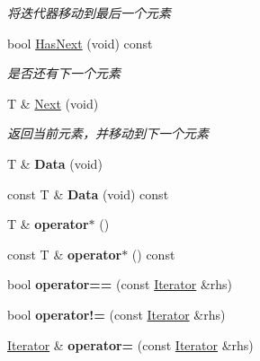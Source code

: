 \begin{DoxyCompactItemize}
\begin{DoxyCompactList}\small\item\em 将迭代器移动到最后一个元素 \end{DoxyCompactList}\item 
bool \hyperlink{class_util_1_1_link_list_t_1_1_iterator_a3021df9a0b22d50e71ec451f860fb627}{Has\-Next} (void) const 
\begin{DoxyCompactList}\small\item\em 是否还有下一个元素 \end{DoxyCompactList}\item 
T \& \hyperlink{class_util_1_1_link_list_t_1_1_iterator_a2dd085a65afcd15667c078446fc712aa}{Next} (void)
\begin{DoxyCompactList}\small\item\em 返回当前元素，并移动到下一个元素 \end{DoxyCompactList}\item 
\hypertarget{class_util_1_1_link_list_t_1_1_iterator_a614c699dcbbc7b9cb2c41cc31d545d2e}{T \& {\bfseries Data} (void)}\label{class_util_1_1_link_list_t_1_1_iterator_a614c699dcbbc7b9cb2c41cc31d545d2e}

\item 
\hypertarget{class_util_1_1_link_list_t_1_1_iterator_ad9194119d4ffc0b90cecc79b8cd50bce}{const T \& {\bfseries Data} (void) const }\label{class_util_1_1_link_list_t_1_1_iterator_ad9194119d4ffc0b90cecc79b8cd50bce}

\item 
\hypertarget{class_util_1_1_link_list_t_1_1_iterator_a4513474b857dbba6c3123fec8672437d}{T \& {\bfseries operator$\ast$} ()}\label{class_util_1_1_link_list_t_1_1_iterator_a4513474b857dbba6c3123fec8672437d}

\item 
\hypertarget{class_util_1_1_link_list_t_1_1_iterator_a0a1eca838c89167bd079b7fbc1cb160b}{const T \& {\bfseries operator$\ast$} () const }\label{class_util_1_1_link_list_t_1_1_iterator_a0a1eca838c89167bd079b7fbc1cb160b}

\item 
\hypertarget{class_util_1_1_link_list_t_1_1_iterator_a25bb77786e573ec7db58c38bf9f06e9f}{bool {\bfseries operator==} (const \hyperlink{class_util_1_1_link_list_t_1_1_iterator}{Iterator} \&rhs)}\label{class_util_1_1_link_list_t_1_1_iterator_a25bb77786e573ec7db58c38bf9f06e9f}

\item 
\hypertarget{class_util_1_1_link_list_t_1_1_iterator_a4a9c03afdc8132f21d6df8ad8a425a3b}{bool {\bfseries operator!=} (const \hyperlink{class_util_1_1_link_list_t_1_1_iterator}{Iterator} \&rhs)}\label{class_util_1_1_link_list_t_1_1_iterator_a4a9c03afdc8132f21d6df8ad8a425a3b}

\item 
\hypertarget{class_util_1_1_link_list_t_1_1_iterator_a3b2e243b8b75ad1c77fa501ac604cc4b}{\hyperlink{class_util_1_1_link_list_t_1_1_iterator}{Iterator} \& {\bfseries operator=} (const \hyperlink{class_util_1_1_link_list_t_1_1_iterator}{Iterator} \&rhs)}\label{class_util_1_1_link_list_t_1_1_iterator_a3b2e243b8b75ad1c77fa501ac604cc4b}

\end{DoxyCompactItemize}
